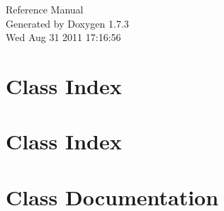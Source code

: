 \documentclass[a4paper]{book}
\begin{document}
\hypersetup{pageanchor=false}
\begin{titlepage}
\vspace*{7cm}
\begin{center}
{\Large Reference Manual}\\
\vspace*{1cm}
{\large Generated by Doxygen 1.7.3}\\
\vspace*{0.5cm}
{\small Wed Aug 31 2011 17:16:56}\\
\end{center}
\end{titlepage}
\clearemptydoublepage
{}
\tableofcontents
\clearemptydoublepage
{}
\hypersetup{pageanchor=true}
\chapter{Class Index}

\chapter{Class Index}

\chapter{Class Documentation}























\printindex
\end{document}
